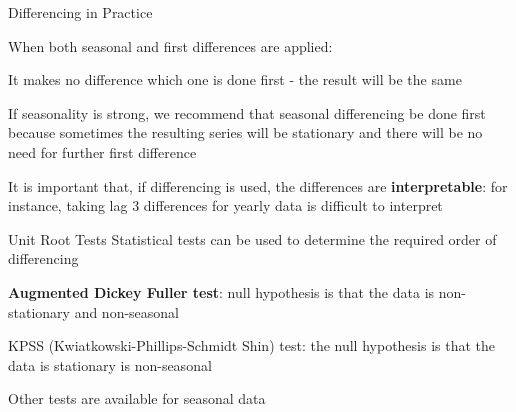 \documentclass{beamer}
\newenvironment{wideitemize}{\itemize\addtolength{\itemsep}{10pt}}{\enditemize}
\newenvironment{wideenumerate}{\enumerate\addtolength{\itemsep}{10pt}}{\endenumerate}
\begin{document}
\begin{frame}{Differencing in Practice}

  When both seasonal and first differences are applied:

  \begin{wideitemize}
    \item It makes no difference which one is done first - the result will be the same
    \item If seasonality is strong, we recommend that seasonal differencing be done first because sometimes the resulting series will be stationary and there will be no need for further first difference
    \item It is important that, if differencing is used, the differences are \textbf{interpretable}: for instance, taking lag 3 differences for yearly data is difficult to interpret
  \end{wideitemize}
\end{frame}


\begin{frame}{Unit Root Tests}
  Statistical tests can be used to determine the required order of differencing\\

  \smallskip

  \begin{wideenumerate}
    \item \textbf{Augmented Dickey Fuller test}: null hypothesis is that the data is non-stationary and non-seasonal
    \item KPSS (Kwiatkowski-Phillips-Schmidt Shin) test: the null hypothesis is that the data is stationary is non-seasonal
    \item Other tests are available for seasonal data
  \end{wideenumerate}
  
  
\end{frame}
\end{document}
